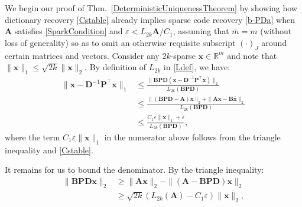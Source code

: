 \documentclass[journal, twocolumn]{IEEEtran}
\begin{document}
We begin our proof of Thm.~\ref{DeterministicUniquenessTheorem} by showing how dictionary recovery \eqref{Cstable} already implies sparse code recovery \eqref{b-PDa} when $\mathbf{A}$ satisfies \eqref{SparkCondition} and \mbox{$\varepsilon < L_{2k}\mathbf{A} / C_1$}, assuming that $\overline m = m$ (without loss of generality) so as to omit an otherwise requisite subscript $(\cdot)_J$ around certain matrices and vectors.
Consider any $2k$-sparse $\mathbf{x} \in \mathbb{R}^m$ and note that $\|\mathbf{x}\|_1 \leq \sqrt{2k}  \|\mathbf{x}\|_2$. By definition of $L_{2k}$ in \eqref{Ldef}, we have:
\begin{align}\label{stuff}
\|\mathbf{x} - \mathbf{D}^{-1}\mathbf{P}^{\top}\mathbf{\overline x} \|_1 \nonumber
&\leq \frac{\|\mathbf{BPD}(\mathbf{x} - \mathbf{D}^{-1}\mathbf{P}^{\top}\mathbf{\overline x})\|_2}{L_{2k}(\mathbf{BPD})} \\ \nonumber
&\leq \frac{\|( \mathbf{BPD} - \mathbf{A}) \mathbf{x}\|_2 + \|\mathbf{A}\mathbf{x} - \mathbf{B}\mathbf{\overline x}\|_2}{L_{2k}(\mathbf{BPD})} \\
&\leq \frac{C_1\varepsilon \|\mathbf{x}\|_1 + \varepsilon}{L_{2k}(\mathbf{BPD})},
\end{align}
where the term $C_1\varepsilon \|\mathbf{x}\|_1$ in the numerator above follows from the triangle inequality and \eqref{Cstable}.

It remains for us to bound the denominator.  By the triangle inequality:
\begin{align*}
\|\mathbf{BPD}\mathbf{x}\|_2 
&\geq \|\mathbf{A}\mathbf{x}\|_2 - \|(\mathbf{A} - \mathbf{BPD})\mathbf{x}\|_2 \\
&\geq \sqrt{2k} (L_{2k}(\mathbf{A}) -  C_1\varepsilon) \|\mathbf{x}\|_2,
\end{align*}
\end{document}
